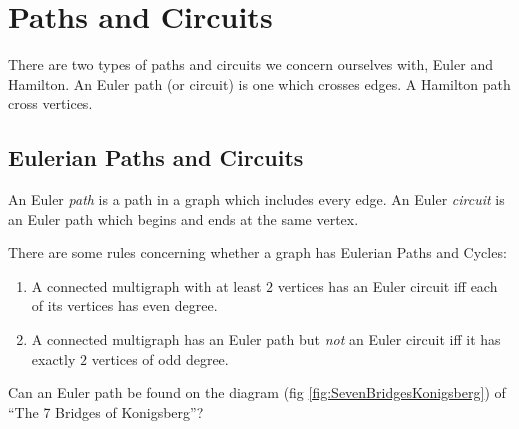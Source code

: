 \chapter{Paths and Circuits}
\label{sec:WalksPathsCircuits}

There are two types of paths and circuits we concern ourselves with, Euler and
Hamilton. An Euler path (or circuit) is one which crosses edges. A Hamilton path
cross vertices.

\section{Eulerian Paths and Circuits}
An Euler \emph{path} is a path in a graph which includes every edge. An Euler
\emph{circuit} is an Euler path which begins and ends at the same vertex.

There are some rules concerning whether a graph has Eulerian Paths and Cycles:
\begin{enumerate}
  \item A connected multigraph with at least $2$ vertices has an Euler circuit
  iff each of its vertices has even degree.
  \item A connected multigraph has an Euler path but \emph{not} an Euler circuit
  iff it has exactly $2$ vertices of odd degree.
\end{enumerate}

Can an Euler path be found on the diagram (fig
\ref{fig:SevenBridgesKonigsberg}) of ``The 7 Bridges of Konigsberg''?


